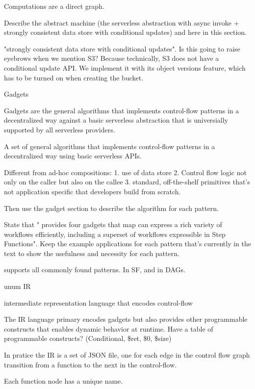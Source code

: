 Computations are a direct graph.


Describe the abstract machine (the serverless abstraction with async invoke +
strongly consistent data store with conditional updates) and here in this
section.

"strongly consistent data store with conditional updates". Is this going to
raise eyebrows when we mention S3? Because technically, S3 does not have a
conditional update API. We implement it with its object versions feature,
which has to be turned on when creating the bucket.



Gadgets%

Gadgets are the general algorithms that implements control-flow patterns in a
decentralized way against a basic serverless abstraction that is universially
supported by all serverless providers.

A set of general algorithms that implements control-flow patterns in a
decentralized way using basic serverless APIs.


Different from ad-hoc compositions: 1. use of data store 2.
Control flow logic not only on the caller but also on the callee 3. standard,
off-the-shelf primitives that's not application specific that developers build
from scratch.


Then use the gadget section to describe the algorithm for each pattern.

State that "\name{} provides four gadgets that map can express a rich variety
of workflows efficiently, including a superset of workflows expressible in
Step Functions". Keep the example applications for each pattern that's
currently in the text to show the usefulness and necessity for each pattern.

supports all commonly found patterns. In SF, and in DAGs.

unum IR%

intermediate representation language that encodes control-flow 

The IR language primary encodes gadgets but also provides other programmable
constructs that enables dynamic behavior at runtime. Have a table of
programmable constructs? (Conditional, \$ret, \$0, \$size)

In pratice the IR is a set of JSON file, one for each edge in the control flow
graph transition from a function to the next in the control-flow.

Each function node has a unique name.

